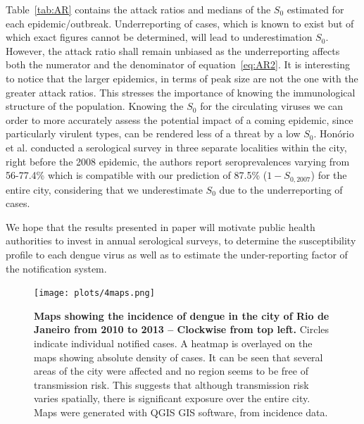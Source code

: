 \documentclass[10pt]{article}
\begin{document}
Table~\ref{tab:AR} contains the attack ratios and medians of the $S_0$ 
estimated for each epidemic/outbreak.
 Underreporting of cases, which is known to exist but of which exact figures 
cannot be determined, will lead to underestimation $S_0$.
However, the attack ratio shall remain unbiased as the underreporting affects 
both the numerator and the denominator of equation~\ref{eq:AR2}.
It is interesting to notice that the larger epidemics, in terms of peak size 
are not the one with the greater attack ratios.
This stresses the importance of knowing the immunological structure of the 
population.
Knowing the $S_0$ for the circulating viruses we can order to more 
accurately assess the potential impact of a coming epidemic, since particularly 
virulent types, can be rendered less of a threat by a low $S_0$.
Hon\'orio et al.\citep{honorio2009spatial} conducted a serological survey in 
three separate localities within the city, right before the 2008 epidemic, the 
authors report seroprevalences varying from 56-77.4\% which is compatible with 
our prediction of 87.5\% ($1-S_{0,2007}$) for the entire city, considering that 
we underestimate $S_0$ due to the underreporting of cases.

We hope that the results presented in paper will motivate public 
health authorities to invest in annual serological surveys, to determine the 
susceptibility profile to each dengue virus as well as to estimate the 
under-reporting factor of the notification system.


\begin{figure}
\begin{center}
\texttt{[image: plots/4maps.png]}
\end{center}
  \caption{{\bf Maps showing the incidence of dengue in the city of Rio de 
Janeiro from 2010 to 2013 -- Clockwise from top left.} Circles indicate 
individual notified cases. A 
heatmap is overlayed on the maps showing absolute density of cases.
It can be seen that several areas of the city were affected and no region seems 
to be free of transmission risk.
This suggests that although transmission risk varies spatially, there is 
significant exposure over the entire city. Maps were generated with QGIS GIS 
software, from incidence data.}
  \label{fig:mapas}
\end{figure}
\end{document}
